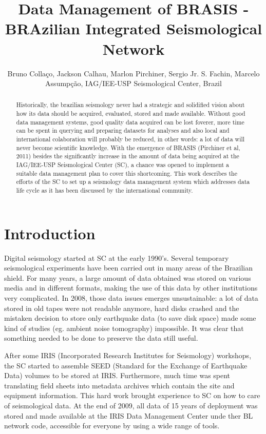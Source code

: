 \documentclass[twoside,letterpaper,twocolumn]{article}
\title{Data Management of BRASIS -
BRAzilian Integrated Seismological Network}
\author{Bruno Colla\c{c}o, Jackson Calhau, Marlon Pirchiner, Sergio Jr. S. Fachin, Marcelo
Assump\c{c}\~{a}o, IAG/IEE-USP Seismological Center, Brazil}
\begin{document}
\maketitle

\begin{abstract}

Historically, the brazilian seismology never had a strategic and solidified vision about how its data should be acquired, evaluated, stored and made available. Without good data management systems, good quality data acquired can be lost foverer, more time can be spent in querying and preparing datasets for analyses and also local and international colaboration will probably be reduced, in other words: a lot of data will never become scientific knowledge. With the emergence of BRASIS (Pirchiner et al, 2011) besides the significantly increase in the amount of data being acquired at the IAG/IEE-USP Seismological Center (SC), a chance was opened to implement a suitable data management plan to cover this shortcoming. This work describes the efforts of the SC to set up a seismology data management system which addresses data life cycle as it has been discussed by the international community.

\end{abstract}

\section{Introduction}

Digital seismology started at SC at the early 1990's. Several temporary seismological experiments have been carried out in many areas of the Brazilian shield. For many years, a large amount of data obtained was stored on various media and in different formats, making the use of this data by other institutions very complicated. In 2008, those data issues emerges unsustainable: a lot of data stored in old tapes were not readable anymore, hard disks crashed and the mistaken decision to store only earthquake data (to save disk space) made some kind of studies (eg. ambient noise tomography) impossible. It was clear that something needed to be done to preserve the data still useful. 

After some IRIS (Incorporated Research Institutes for Seismology) workshops, the SC started to assemble SEED (Standard for the Exchange of Earthquake Data) volumes to be stored at IRIS. Furthermore, much time was spent translating field sheets into metadata archives which contain the site and equipment information. This hard work brought experience to SC on how to care of seismological data. At the end of 2009, all data of 15 years of deployment was stored and made available at the IRIS Data Management Center unde ther BL network code, accessible for everyone by using a wide range of tools.
\end{document}

